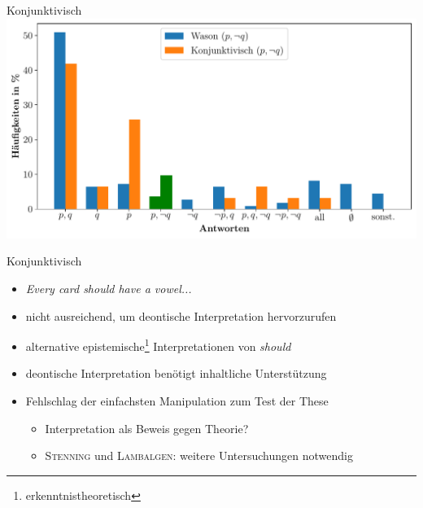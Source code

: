 \begin{frame}{Konjunktivisch {\scriptsize \cite[S.~109]{stenningHumanReasoningCognitive2008}}}
    \includegraphics[width=\textwidth]{../plot/results_subjunctive.pdf}
\end{frame}


\begin{frame}{Konjunktivisch {\scriptsize \cite[S.~110]{stenningHumanReasoningCognitive2008}}}
    \begin{itemize}
        \item \emph{Every card \alert{should} have a vowel...}
        \item nicht ausreichend, um deontische Interpretation hervorzurufen
        \item alternative epistemische\footnote[frame]{\scriptsize erkenntnistheoretisch} Interpretationen von \emph{should}
        \item deontische Interpretation benötigt inhaltliche Unterstützung
        
        \item Fehlschlag der einfachsten Manipulation zum Test der These
        \begin{itemize}
            \item Interpretation als Beweis gegen Theorie?
            \item \textsc{Stenning} und \textsc{Lambalgen}: weitere Untersuchungen notwendig
        \end{itemize}
    \end{itemize}
\end{frame}


